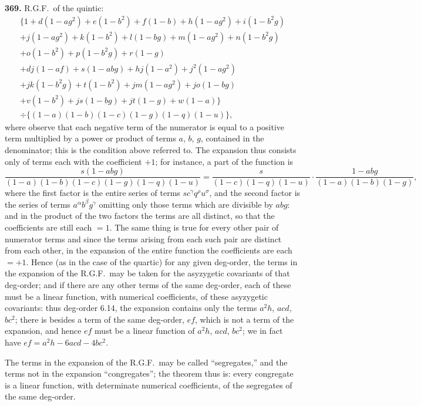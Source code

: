\documentclass[11pt,a4paper]{book}
\begin{document}
\medskip

\noindent\textbf{369.} R.G.F.\ of the quintic:
\begin{multline*}
\{1 + d(1-ag^2) + e(1-b^2) + f(1-b) + h(1-ag^2) + i(1-b^2g)\\
+ j(1-ag^2) + k(1-b^2) + l(1-bg) + m(1-ag^2) + n(1-b^2g)\\
+ o(1-b^2) + p(1-b^2g) + r(1-g)\\
+ dj(1-af) + s(1-abg) + hj(1-a^2) + j^2(1-ag^2)\\
+ jk(1-b^2g) + t(1-b^2) + jm(1-ag^2) + jo(1-bg)\\
+ v(1-b^2) + js(1-bg) + jt(1-g) + w(1-a)\}\\
\div \{(1-a)(1-b)(1-c)(1-g)(1-q)(1-u)\},
\end{multline*}
where observe that each negative term of the numerator is equal to a positive term multiplied by a power or product of terms $a$, $b$, $g$, contained in the denominator; this is the condition above referred to. The expansion thus consists only of terms each with the coefficient $+1$; for instance, a part of the function is
\[
\frac{s(1-abg)}{(1-a)(1-b)(1-c)(1-g)(1-q)(1-u)} = \frac{s}{(1-c)(1-q)(1-u)} \cdot \frac{1-abg}{(1-a)(1-b)(1-g)},
\]
where the first factor is the entire series of terms $s c^\gamma q^\rho u^\sigma$, and the second factor is the series of terms $a^\alpha b^\beta g^\gamma$ omitting only those terms which are divisible by $abg$: and in the product of the two factors the terms are all distinct, so that the coefficients are still each $=1$. The same thing is true for every other pair of numerator terms and since the terms arising from each such pair are distinct from each other, in the expansion of the entire function the coefficients are each $=+1$. Hence (as in the case of the quartic) for any given deg-order, the terms in the expansion of the R.G.F.\ may be taken for the asyzygetic covariants of that deg-order; and if there are any other terms of the same deg-order, each of these must be a linear function, with numerical coefficients, of these asyzygetic covariants: thus deg-order 6.14, the expansion contains only the terms $a^2 h$, $acd$, $bc^2$; there is besides a term of the same deg-order, $ef$, which is not a term of the expansion, and hence $ef$ must be a linear function of $a^2 h$, $acd$, $bc^2$; we in fact have $ef = a^2 h - 6acd - 4bc^2$.

The terms in the expansion of the R.G.F.\ may be called ``segregates,'' and the terms not in the expansion ``congregates''; the theorem thus is: every congregate is a linear function, with determinate numerical coefficients, of the segregates of the same deg-order.
\end{document}
